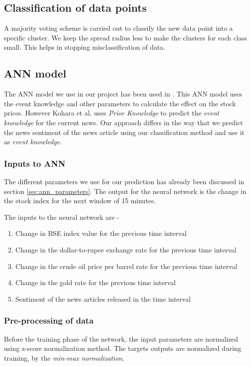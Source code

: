 \documentclass[review,twocolumn,5p]{elsarticle}
\begin{document}
\subsection{Classification of data points}

A majority voting scheme is carried out to classify the new data point into a specific cluster. We keep the spread radius less to make the clusters for each class small. This helps in stopping misclassification of data.

\subsection{ANN model}
\label{sec:ann}
The ANN model we use in our project has been used in \cite{kohara:1997}. This ANN model uses the event knowledge and other parameters to calculate the effect on the stock prices. However Kohara et al. uses \textit{Prior Knowledge} to predict the \textit{event knowledge} for the current news. Our approach differs in the way that we predict the news sentiment of the news article using our classification method and use it as \textit{event knowledge}. 

\subsubsection{Inputs to ANN}

The different parameters we use for our prediction has already been discussed in section \ref{sec:ann_parameters}. The output for the neural network is the change in the stock index for the next window of 15 minutes. 

The inputs to the neural network are - 
\begin{enumerate}
\item Change in BSE index value for the previous time interval
\item Change in the dollar-to-rupee exchange rate for the previous time interval
\item Change in the crude oil price per barrel rate for the previous time interval
\item Change in the gold rate for the previous time interval
\item Sentiment of the news articles released in the time interval
\end{enumerate}

\subsubsection{Pre-processing of data}
Before the training phase of the network, the input parameters are normalized using z-score normalization method. The targets outputs are normalized during training, by the \textit{min-max normalization}. 
\end{document}
